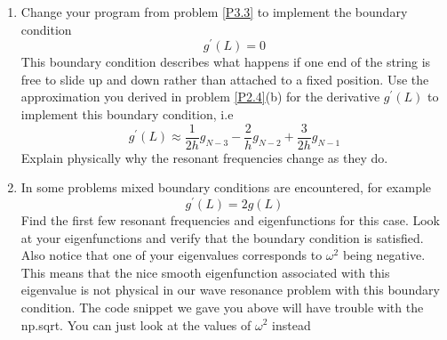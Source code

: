 \begin{problem} \label{P3.4}
\begin{enumerate}[label=(\alph*)]
	\item Change your program from problem \ref{P3.3} to implement the boundary
condition  \begin{equation*}
		g^\prime(L) = 0
				\end{equation*}
				This boundary condition describes what happens if one end of the
string is free to slide up and down rather than attached to a fixed
position. Use the approximation you derived in problem \ref{P2.4}(b) for the
derivative $g^\prime(L)$ to implement this boundary condition, i.e
\begin{equation*}
		g^\prime(L) \approx \frac{1}{2h}g_{N-3} - \frac{2}{h}g_{N-2} + \frac{3}{2h}g_{N-1}
				\end{equation*}Explain physically why the resonant frequencies change as they do.
				\item In some problems mixed boundary conditions are encountered, for
example\begin{equation*}
		g^\prime(L) = 2g(L)
				\end{equation*}Find the first few resonant frequencies and eigenfunctions for this
case. Look at your eigenfunctions and verify that the boundary condition is satisfied. Also notice that one of your eigenvalues corresponds
to $\omega^2$ being negative. This means that the nice smooth eigenfunction
associated with this eigenvalue is not physical in our wave resonance
problem with this boundary condition. The code snippet we gave you
above will have trouble with the np.sqrt. You can just look at the
values of $\omega^2$ instead
\end{enumerate}
\end{problem}
